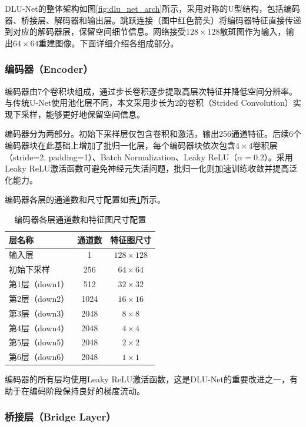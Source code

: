 {DLU-Net的整体架构如图\ref{fig:dlu_net_arch}所示，采用对称的U型结构，包括编码器、桥接层、解码器和输出层。跳跃连接（图中红色箭头）将编码器特征直接传递到对应的解码器层，保留空间细节信息。网络接受$128\times128$散斑图作为输入，输出$64\times64$重建图像。下面详细介绍各组成部分。

\subsubsection{编码器（Encoder）}

编码器由7个卷积块组成，通过步长卷积逐步提取高层次特征并降低空间分辨率。与传统U-Net使用池化层不同，本文采用步长为2的卷积（Strided Convolution）实现下采样，能够更好地保留空间信息。

编码器分为两部分。初始下采样层仅包含卷积和激活，输出256通道特征。后续6个编码器块在此基础上增加了批归一化层，每个编码器块依次包含$4\times4$卷积层（stride=2, padding=1）、Batch Normalization、Leaky ReLU（$\alpha=0.2$）。采用Leaky ReLU激活函数可避免神经元失活问题，批归一化则加速训练收敛并提高泛化能力。

编码器各层的通道数和尺寸配置如表\ref{tab:encoder_config}所示。

\begin{table}[htbp]
    \centering
    \small
    \caption{编码器各层通道数和特征图尺寸配置}
    \label{tab:encoder_config}
    \begin{tabular}{lcc}
        \hline
        \textbf{层名称} & \textbf{通道数} & \textbf{特征图尺寸} \\
        \hline
        输入层 & 1 & $128\times128$ \\
        初始下采样 & 256 & $64\times64$ \\
        第1层（down1） & 512 & $32\times32$ \\
        第2层（down2） & 1024 & $16\times16$ \\
        第3层（down3） & 2048 & $8\times8$ \\
        第4层（down4） & 2048 & $4\times4$ \\
        第5层（down5） & 2048 & $2\times2$ \\
        第6层（down6） & 2048 & $1\times1$ \\
        \hline
    \end{tabular}
\end{table}

编码器的所有层均使用Leaky ReLU激活函数，这是DLU-Net的重要改进之一，有助于在编码阶段保持良好的梯度流动。

\subsubsection{桥接层（Bridge Layer）}

}
